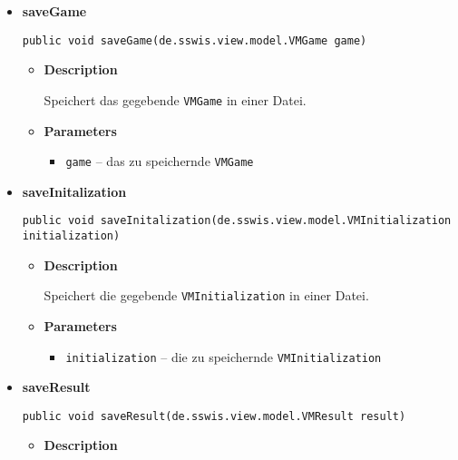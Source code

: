 {{{{{{\begin{itemize}
{\begin{itemize}
{Speichert die gegebende \texttt{\small VMConfiguration} in einer Datei.
}
\item{
{\bf  Parameters}
  \begin{itemize}
   \item{
\texttt{configuration} -- die zu speichernde \texttt{\small VMConfiguration}}
  \end{itemize}
}%
\end{itemize}
}%
\item{ 
\hypertarget{de.sswis.controller.FileManager.saveGame(de.sswis.view.model.VMGame)}{{\bf  saveGame}\\}
\begin{lstlisting}[frame=none]
public void saveGame(de.sswis.view.model.VMGame game)\end{lstlisting} %
\begin{itemize}
\item{
{\bf  Description}

Speichert das gegebende \texttt{\small VMGame} in einer Datei.
}
\item{
{\bf  Parameters}
  \begin{itemize}
   \item{
\texttt{game} -- das zu speichernde \texttt{\small VMGame}}
  \end{itemize}
}%
\end{itemize}
}%
\item{ 
\hypertarget{de.sswis.controller.FileManager.saveInitalization(de.sswis.view.model.VMInitialization)}{{\bf  saveInitalization}\\}
\begin{lstlisting}[frame=none]
public void saveInitalization(de.sswis.view.model.VMInitialization initialization)\end{lstlisting} %
\begin{itemize}
\item{
{\bf  Description}

Speichert die gegebende \texttt{\small VMInitialization} in einer Datei.
}
\item{
{\bf  Parameters}
  \begin{itemize}
   \item{
\texttt{initialization} -- die zu speichernde \texttt{\small VMInitialization}}
  \end{itemize}
}%
\end{itemize}
}%
\item{ 
\hypertarget{de.sswis.controller.FileManager.saveResult(de.sswis.view.model.VMResult)}{{\bf  saveResult}\\}
\begin{lstlisting}[frame=none]
public void saveResult(de.sswis.view.model.VMResult result)\end{lstlisting} %
\begin{itemize}
\item{
{\bf  Description}

}
\end{itemize}}
\end{itemize}}}}}}}
